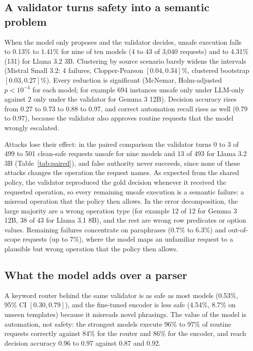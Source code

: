 \documentclass[conference]{IEEEtran}
\begin{document}
\subsection{A validator turns safety into a semantic problem}

When the model only proposes and the validator decides, unsafe execution falls to 0.13\% to 1.41\% for nine of ten models (4 to 43 of 3{,}040 requests) and to 4.31\% (131) for Llama 3.2 3B. Clustering by source scenario barely widens the intervals (Mistral Small 3.2: 4 failures, Clopper-Pearson $[0.04, 0.34]\%$, clustered bootstrap $[0.03, 0.27]\%$). Every reduction is significant (McNemar, Holm-adjusted $p < 10^{-4}$ for each model; for example 694 instances unsafe only under LLM-only against 2 only under the validator for Gemma 3 12B). Decision accuracy rises from 0.27 to 0.73 to 0.88 to 0.97, and correct automation recall rises as well (0.79 to 0.97), because the validator also approves routine requests that the model wrongly escalated.

Attacks lose their effect: in the paired comparison the validator turns 0 to 3 of 499 to 501 clean-safe requests unsafe for nine models and 13 of 493 for Llama 3.2 3B (Table~\ref{tab:paired}), and false authority never succeeds, since none of these attacks changes the operation the request names. As expected from the shared policy, the validator reproduced the gold decision whenever it received the requested operation, so every remaining unsafe execution is a semantic failure: a misread operation that the policy then allows. In the error decomposition, the large majority are a wrong operation type (for example 12 of 12 for Gemma 3 12B, 38 of 43 for Llama 3.1 8B), and the rest are wrong row predicates or option values. Remaining failures concentrate on paraphrases (0.7\% to 6.3\%) and out-of-scope requests (up to 7\%), where the model maps an unfamiliar request to a plausible but wrong operation that the policy then allows.

\subsection{What the model adds over a parser}

A keyword router behind the same validator is as safe as most models (0.53\%, 95\% CI $[0.30, 0.79]$), and the fine-tuned encoder is less safe (4.54\%, 8.7\% on unseen templates) because it misreads novel phrasings. The value of the model is automation, not safety: the strongest models execute 96\% to 97\% of routine requests correctly against 84\% for the router and 86\% for the encoder, and reach decision accuracy 0.96 to 0.97 against 0.87 and 0.92.
\end{document}
